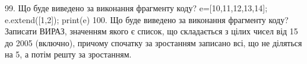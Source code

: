 \documentclass[11pt]{article}
\begin{document}
99. Що буде виведено за виконання фрагменту коду?
e=[10,11,12,13,14]; e.extend([1,2]); print(e)
100. Що буде виведено за виконання фрагменту коду?
Записати ВИРАЗ, значенням якого є список, що складається з цілих чисел від 15 до 2005 (включно), причому спочатку за зростанням записано всі, що не діляться на 5, а потім решту за зростанням.




































































































\newpage
\end{document}
